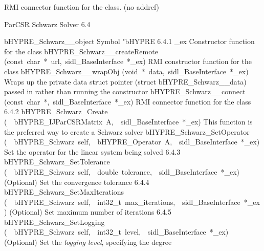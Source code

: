 \documentclass{article}
\begin{document}
\begin{cxxentry}
\begin{cxxentry}
\begin{cxxvariable}
\begin{cxxdoc}
RMI connector function for the class. (no addref)
\end{cxxdoc}
\end{cxxvariable}
\end{cxxentry}
\begin{cxxentry}
{}
        {ParCSR Schwarz Solver}
        {}
        {
}
        {6.4}
\begin{cxxnames}
        {bHYPRE\_Schwarz\_\_object}
        {}
        {
Symbol "bHYPRE}
        {6.4.1}
        {\_ex}
        {}
        {
Constructor function for the class}
        {}
\label{cxx.6.4.11}
        {bHYPRE\_Schwarz\_\_createRemote}
        {(const\ char\ *\ url,\ sidl\_BaseInterface\ *\_ex)}
        {
RMI constructor function for the class}
        {}
\label{cxx.6.4.12}
        {bHYPRE\_Schwarz\_\_wrapObj}
        {(void\ *\ data,\ sidl\_BaseInterface\ *\_ex)}
        {
Wraps up the private data struct pointer (struct bHYPRE\_Schwarz\_\_data) passed in rather than running the constructor}
        {}
\label{cxx.6.4.13}
        {bHYPRE\_Schwarz\_\_connect}
        {(const\ char\ *,\ sidl\_BaseInterface\ *\_ex)}
        {
RMI connector function for the class}
        {6.4.2}
        {bHYPRE\_Schwarz\_Create}
        {(\ \ bHYPRE\_IJParCSRMatrix\ A,\ \ sidl\_BaseInterface\ *\_ex)}
        {
This function is the preferred way to create a Schwarz solver}
        {}
\label{cxx.6.4.14}
        {bHYPRE\_Schwarz\_SetOperator}
        {(\ \ bHYPRE\_Schwarz\ self,\ \ bHYPRE\_Operator\ A,\ \ sidl\_BaseInterface\ *\_ex)}
        {
Set the operator for the linear system being solved}
        {6.4.3}
        {bHYPRE\_Schwarz\_SetTolerance}
        {(\ \ bHYPRE\_Schwarz\ self,\ \ double\ tolerance,\ \ sidl\_BaseInterface\ *\_ex)}
        {
(Optional) Set the convergence tolerance}
        {6.4.4}
        {bHYPRE\_Schwarz\_SetMaxIterations}
        {(\ \ bHYPRE\_Schwarz\ self,\ \ int32\_t\ max\_iterations,\ \ sidl\_BaseInterface\ *\_ex)}
        {
(Optional) Set maximum number of iterations}
        {6.4.5}
        {bHYPRE\_Schwarz\_SetLogging}
        {(\ \ bHYPRE\_Schwarz\ self,\ \ int32\_t\ level,\ \ sidl\_BaseInterface\ *\_ex)}
        {
(Optional) Set the {\it logging level}, specifying the degree
}
\end{cxxnames}
\end{cxxentry}
\end{cxxentry}
\end{document}
